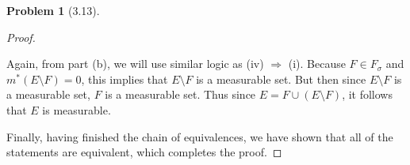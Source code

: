 \documentclass[12pt]{article}
\theoremstyle{definition}
\newtheorem{problem}{Problem}
\begin{document}
\begin{problem}[3.13]
\begin{enumerate}[label = \alph{*}.]
\begin{proof}
\begin{enumerate}
                    Again, from part (b), we will use similar logic as (iv) \( \Rightarrow \) (i). Because \( F \in F_{\sigma} \) and \( m^{*}(E \setminus F) = 0 \), this implies that \( E \setminus F \) is a measurable set. But then since \( E \setminus F \)  is a measurable set, \( F \) is a measurable set. Thus since \( E = F \cup (E \setminus F) \), it follows that \( E \) is measurable.
                \end{enumerate}

                Finally, having finished the chain of equivalences, we have shown that all of the statements are equivalent, which completes the proof.
            \end{proof}
            
            
        \end{enumerate}
\end{problem}
\end{document}
